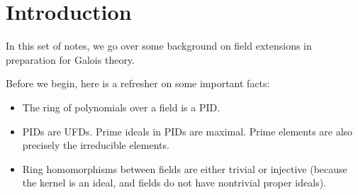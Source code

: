 \section{Introduction}
In this set of notes, we go over some background on field extensions in preparation for Galois theory.

Before we begin, here is a refresher on some important facts:
\begin{itemize}
    \item The ring of polynomials over a field is a PID.
    \item PIDs are UFDs. Prime ideals in PIDs are maximal. Prime elements are also precisely the irreducible elements.
    \item Ring homomorphisms between fields are either trivial or injective (because the kernel is an ideal, and fields do not have nontrivial proper ideals).
\end{itemize}

